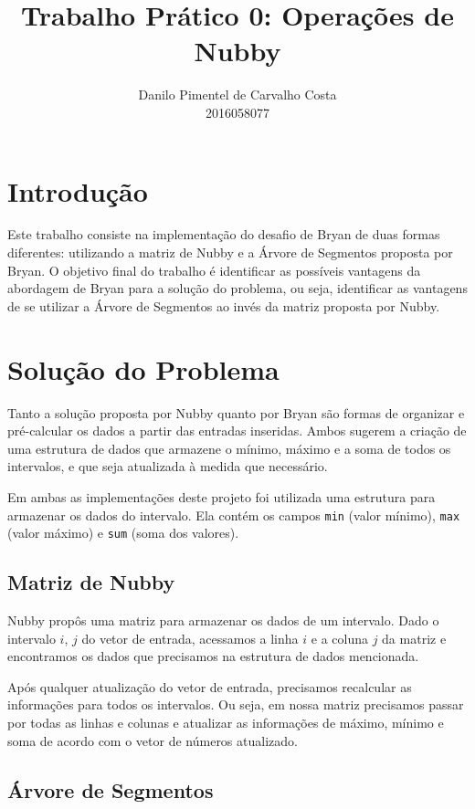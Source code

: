 \documentclass{article}
\title{Trabalho Prático 0: Operações de Nubby}
\author{Danilo Pimentel de Carvalho Costa\\2016058077}
\date{}
\begin{document}
\maketitle

\section{Introdução}

Este trabalho consiste na implementação do desafio de Bryan de duas formas diferentes: utilizando a matriz de Nubby e a Árvore de Segmentos proposta por Bryan. O objetivo final do trabalho é identificar as possíveis vantagens da abordagem de Bryan para a solução do problema, ou seja, identificar as vantagens de se utilizar a Árvore de Segmentos ao invés da matriz proposta por Nubby.

\section{Solução do Problema}

Tanto a solução proposta por Nubby quanto por Bryan são formas de organizar e pré-calcular os dados a partir das entradas inseridas. Ambos sugerem a criação de uma estrutura de dados que armazene o mínimo, máximo e a soma de todos os intervalos, e que seja atualizada à medida que necessário.

Em ambas as implementações deste projeto foi utilizada uma estrutura para armazenar os dados do intervalo. Ela contém os campos \texttt{min} (valor mínimo), \texttt{max} (valor máximo) e \texttt{sum} (soma dos valores).

\subsection{Matriz de Nubby}

Nubby propôs uma matriz para armazenar os dados de um intervalo. Dado o intervalo $i$, $j$ do vetor de entrada, acessamos a linha $i$ e a coluna $j$ da matriz e encontramos os dados que precisamos na estrutura de dados mencionada.

Após qualquer atualização do vetor de entrada, precisamos recalcular as informações para todos os intervalos. Ou seja, em nossa matriz precisamos passar por todas as linhas e colunas e atualizar as informações de máximo, mínimo e soma de acordo com o vetor de números atualizado.

\subsection{Árvore de Segmentos}
\end{document}
